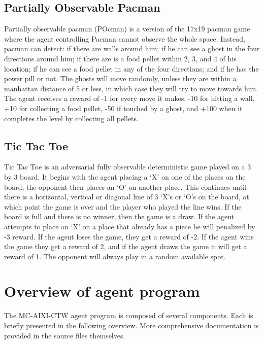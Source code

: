 \documentclass{article}
\theoremstyle{definition}
\newtheorem{primary statistics}[definition]{Primary Statistics}
\newtheorem{auxiliary statistics}[definition]{Auxiliary Statistics}
\begin{document}
\subsection{Partially Observable Pacman}
Partially observable pacman (POcman) is a version of the 17x19 pacman game where the agent controlling Pacman cannot observe the whole space. Instead, pacman can detect: if there are walls around him; if he can see a ghost in the four directions around him; if there are is a food pellet within 2, 3, and 4 of his location; if he can see a food pellet in any of the four directions; and if he has the power pill or not. The ghosts will move randomly, unless they are within a manhattan distance of 5 or less, in which case they will try to move towards him. The agent receives a reward of -1 for every move it makes, -10 for hitting a wall, +10 for collecting a food pellet, -50 if touched by a ghost, and +100 when it completes the level by collecting all pellets.

\subsection{Tic Tac Toe}
Tic Tac Toe is an adversarial fully observable deterministic game played on a 3 by 3 board. It begins with the agent placing a ‘X’ on one of the places on the board, the opponent then places an ‘O’ on another place. This continues until there is a horizontal, vertical or diagonal line of 3 ‘X’s or ‘O’s on the board, at which point the game is over and the player who played the line wins. If the board is full and there is no winner, then the game is a draw. If the agent attempts to place an ‘X’ on a place that already has a piece he will penalized by -3 reward. If the agent loses the game, they get a reward of -2. If the agent wins the game they get a reward of 2, and if the agent draws the game it will get a reward of 1. The opponent will always play in a random available spot.


\section{Overview of agent program}

The MC-AIXI-CTW agent program is composed of several components. Each is briefly presented in the following overview. More comprehensive documentation is provided in the source files themselves. \\ 

\end{document}
